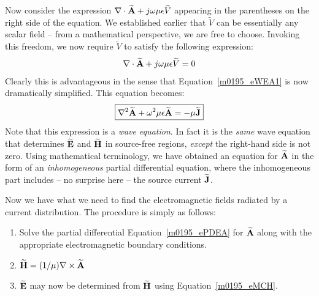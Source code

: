 %
Now consider the expression
$\nabla \cdot \widetilde{\bf A} +j\omega\mu\epsilon\widetilde V$
appearing in the parentheses on the right side of the equation.
We established earlier that $\widetilde V$ can be essentially any scalar field -- from a mathematical perspective, we are free to choose.
Invoking this freedom, we now require $\widetilde V$ to satisfy the following expression:
%
\begin{equation}
\nabla \cdot \widetilde{\bf A} +j\omega\mu\epsilon\widetilde V = 0
\label{m0195_eLGC}
\end{equation}
%
Clearly this is advantageous in the sense that Equation~\ref{m0195_eWEA1} is now dramatically simplified. This equation becomes:
%
\begin{equation}
\boxed{
\nabla^2 \widetilde{\bf A}
+\omega^2\mu\epsilon\widetilde{\bf A} 
= 
-\mu\widetilde{\bf J} 
}
\label{m0195_ePDEA}
\end{equation}
%
Note that this expression is a \emph{wave equation}.
In fact it is the \emph{same} wave equation that determines $\widetilde{\bf E}$ and $\widetilde{\bf H}$ in source-free regions, \emph{except} the right-hand side is not zero.
Using mathematical terminology, we have obtained an equation for $\widetilde{\bf A}$ in the form of an \emph{inhomogeneous} partial differential equation, where the inhomogeneous part includes -- no surprise here -- the source current $\widetilde{\bf J}$.

Now we have what we need to find the electromagnetic fields radiated by a current distribution.
The procedure is simply as follows:
%
\begin{enumerate}
\item Solve the partial differential Equation~\ref{m0195_ePDEA} for $\widetilde{\bf A}$ along with the appropriate electromagnetic boundary conditions.
\item $\widetilde{\bf H} = (1/\mu) \nabla \times \widetilde{\bf A}$
\item $\widetilde{\bf E}$ may now be determined from $\widetilde{\bf H}$ using Equation~\ref{m0195_eMCH}.
\end{enumerate}

